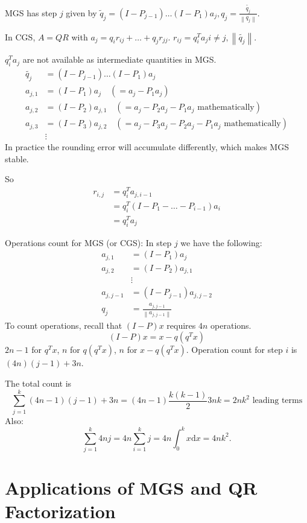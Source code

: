 \documentclass{report}
\newcommand{\df}{\mathrm{d}}
\newcommand{\norm}[1]{\left\| #1 \right\|}
\theoremstyle{definition}
\theoremstyle{remark}
\numberwithin{equation}{section}
\begin{document}
MGS has step $j$ given by $\tilde{q}_j = (I - P_{j-1})\ldots(I - P_1)a_j, q_j = \frac{\tilde{q_j}}{\norm{q_j}}$.

In CGS, $A = QR$ with $a_j = q_ir_{ij} + \ldots + q_jr_{jj}$. $r_{ij} = q_i^T a_j i\neq j, \norm{\tilde{q_j}}$.

$q_i^Ta_j$ are not available as intermediate quantities in MGS.
\begin{align*}
    \tilde{q_j} & = (I - P_{j-1})\ldots(I - P_{1})a_j \\
    a_{j, 1} & = (I - P_1)a_j \quad (= a_j - P_1a_j) \\
    a_{j, 2} & = (I - P_2)a_{j, 1} \quad (= a_j - P_2a_j - P_1a_j \text{ mathematically}) \\
    a_{j, 3} & = (I - P_3)a_{j, 2} \quad (= a_j - P_3a_j - P_2a_j - P_1a_j \text{ mathematically}) \\
    & \vdots
\end{align*}
In practice the rounding error will accumulate differently, which makes MGS stable.

So \begin{align*}
    r_{i,j} & = q_i^Ta_{j, i-1} \\
    & = q_i^T (I - P_1 - \ldots - P_{i-1}) a_i \\
    & = q_i^Ta_j
\end{align*}

Operations count for MGS (or CGS):
In step $j$ we have the following:
\begin{align*}
    a_{j, 1} & = (I - P_1) a_j \\
    a_{j, 2} & = (I - P_2) a_{j, 1} \\
    & \vdots \\
    a_{j, j - 1} & = (I - P_{j - 1}) a_{j, j-2} \\
    q_j & = \frac{a_{j, j-1}}{\norm{a_{j, j-1}}}
\end{align*}
To count operations, recall that $(I-P)x$ requires $4n$ operations.
\[
(I - P)x = x - q(q^Tx)    
\] $2n - 1$ for $q^Tx$, $n$ for $q(q^Tx)$, $n$ for $x - q(q^Tx)$. Operation count for step $i$ is $(4n)(j-1) + 3n$.

The total count is \[
    \sum_{j=1}^k (4n-1)(j-1) + 3n = (4n-1)\frac{k(k-1)}{2} 3nk = 2nk^2 \text{ leading terms}    
\]
Also:
\[
    \sum_{j=1}^k 4nj = 4n \sum_{i=1}^k j = 4n \int_0^k x \df x = 4nk^2.
\]

\section{Applications of MGS and QR Factorization}
\end{document}
